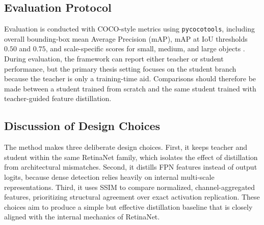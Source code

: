 \documentclass[12pt]{article}
\begin{document}
\subsection{Evaluation Protocol}
Evaluation is conducted with COCO-style metrics using \texttt{pycocotools}, including overall bounding-box mean Average Precision (mAP), mAP at IoU thresholds $0.50$ and $0.75$, and scale-specific scores for small, medium, and large objects \cite{lin2014coco}. During evaluation, the framework can report either teacher or student performance, but the primary thesis setting focuses on the student branch because the teacher is only a training-time aid. Comparisons should therefore be made between a student trained from scratch and the same student trained with teacher-guided feature distillation.

\subsection{Discussion of Design Choices}
The method makes three deliberate design choices. First, it keeps teacher and student within the same RetinaNet family, which isolates the effect of distillation from architectural mismatches. Second, it distills FPN features instead of output logits, because dense detection relies heavily on internal multi-scale representations. Third, it uses SSIM to compare normalized, channel-aggregated features, prioritizing structural agreement over exact activation replication. These choices aim to produce a simple but effective distillation baseline that is closely aligned with the internal mechanics of RetinaNet.



\end{document}
